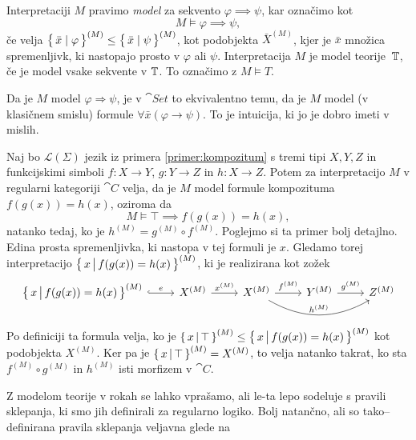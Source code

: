 \documentclass[../kategoricna_logika.tex]{subfiles}
\begin{document}
\begin{definicija}
  Interpretaciji $M$ pravimo \emph{model} za sekvento
  $\varphi \implies \psi$, kar označimo kot
  $$M \models \varphi \implies \psi,$$
  če velja
  $\left\lbrace\,\bar{x} \mid \varphi\,\right\rbrace^{(M)} \leq \left\lbrace\,\bar{x} \mid
    \psi\,\right\rbrace^{(M)}$, kot podobjekta $\bar{X}^{(M)}$, kjer je $\bar{x}$
  množica spremenljivk, ki nastopajo prosto v $\varphi$ ali $\psi$.
  Interpretacija $M$ je model teorije~$\mathbb{T}$, če je model vsake sekvente
  v $\mathbb{T}$.  To označimo z $M \models T$.
\end{definicija}
\begin{opomba}
  Da je $M$ model $\varphi \Rightarrow \psi$, je v $\cat{Set}$ to
  ekvivalentno temu, da je $M$ model (v klasičnem smislu) formule
  $\forall \bar{x} (\varphi \rightarrow \psi)$. To je intuicija, ki jo
  je dobro imeti v mislih.
\end{opomba}
\begin{primer}
  Naj bo $\mathcal{L}(\Sigma)$ jezik iz primera
  \ref{primer:kompozitum} s tremi tipi $X,Y,Z$ in funkcijskimi simboli
  $f : X \to Y$, $g : Y \to Z$ in $h : X \to Z$.  Potem za
  interpretacijo $M$ v regularni kategoriji $\cat{C}$ velja, da je $M$
  model formule kompozituma $f(g(x)) = h(x)$, oziroma da
  $$M \models \top \implies f(g(x)) = h(x),$$ 
  natanko tedaj, ko je $h^{(M)} = g^{(M)} \circ f^{(M)}$.  Poglejmo si
  ta primer bolj detajlno.  Edina prosta spremenljivka, ki nastopa v
  tej formuli je $x$. Gledamo torej interpretacijo
  $\left\lbrace\,x \,\middle|\, f(g(x)) = h(x)\,\right\rbrace^{(M)}$, ki je realizirana kot
  zožek
  \begin{equation*}
    \begin{tikzcd}[column sep=normal]
      \set{x \,\middle|\, f(g(x)) = h(x)}^{(M)} \ar[r, hook, "e"] &
      X^{(M)} \ar[r, "x^{(M)}"] & X^{(M)} \ar[r, "f^{(M)}"] \ar[rr,
      bend right, "h^{(M)}"] & Y^{(M)} \ar[r, "g^{(M)}"] & Z^{(M)}
    \end{tikzcd}
  \end{equation*}
  Po definiciji ta formula velja, ko je
  $\left\lbrace\,x \,\middle|\, \top\,\right\rbrace^{(M)} \leq \left\lbrace\,x \,\middle|\, f(g(x)) =
    h(x)\,\right\rbrace^{(M)}$ kot podobjekta $X^{(M)}$.  Ker pa je
  $\left\lbrace\,x \,\middle|\, \top\,\right\rbrace^{(M)} = X^{(M)}$, to velja natanko
  takrat, ko sta $f^{(M)} \circ g^{(M)}$ in $h^{(M)}$ isti morfizem v
  $\cat{C}$.
\end{primer}
Z modelom teorije v rokah se lahko vprašamo, ali le-ta lepo sodeluje s
pravili sklepanja, ki smo jih definirali za regularno logiko.  Bolj
natančno, ali so tako--definirana pravila sklepanja veljavna glede na
\end{document}
